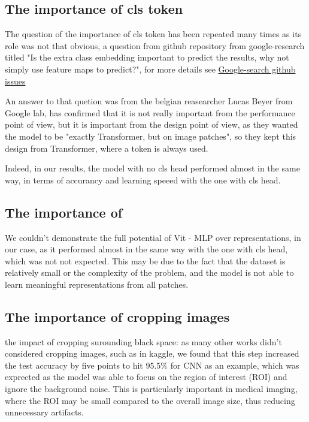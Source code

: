 \documentclass[twocolumn,superscriptaddress,aps]{revtex4-1}
\begin{document}
\subsection{The importance of cls token}

The question of the importance of cls token has been repeated many times as its role was not that obvious, a question from github repository from google-research titled "Is the extra class embedding important to predict the results, why not simply use feature maps to predict?", for more details see \href{https://github.com/google-research/vision_transformer/issues/61#issuecomment-802233921}{Google-search github issues}


An answer to that quetion was from the belgian reasearcher Lucas Beyer from Google lab, has confirmed that it is not really important from the performance point of view, but it is important from the design point of view, as they wanted the model to be "exactly Transformer, but on image patches", so they kept this design from Transformer, where a token is always used. 

Indeed, in our results, the model with no cls head performed almost in the same way, in terms of accurancy and learning speeed with the one with cls head.

\subsection{The importance of }
We couldn't demonstrate the full potential of Vit - MLP over representations, in our case, as it  performed almost in the same way with the one with cls head, which was not not expected. This may be due to the fact that the dataset is relatively small or the complexity of the problem, and the model is not able to learn meaningful representations from all patches.


\subsection{The importance of cropping images}
the impact of cropping surounding black space: as many other works didn't considered cropping images, such as in kaggle, we found that this step increased the test accuracy by five points to hit $95.5\%$ for CNN as an example, which was exprected as the model was able to focus on the region of interest (ROI) and ignore the background noise. This is particularly important in medical imaging, where the ROI may be small compared to the overall image size, thus reducing unnecessary artifacts.
\end{document}
